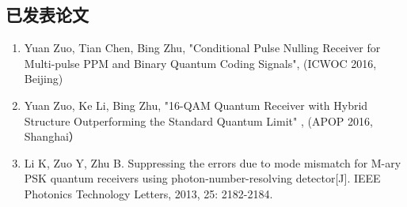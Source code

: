 ﻿\begin{publications}

\section*{已发表论文}

\begin{enumerate}
\item Yuan Zuo, Tian Chen, Bing Zhu, "Conditional Pulse Nulling Receiver for Multi-pulse PPM and Binary Quantum Coding Signals", (ICWOC 2016, Beijing)
\item Yuan Zuo, Ke Li, Bing Zhu, "16-QAM Quantum Receiver with Hybrid Structure Outperforming the Standard Quantum Limit" , (APOP 2016, Shanghai）
\item Li K, Zuo Y, Zhu B. Suppressing the errors due to mode mismatch for M-ary PSK quantum receivers using photon-number-resolving detector[J]. IEEE Photonics Technology Letters, 2013, 25: 2182-2184.
\end{enumerate}



\end{publications}
